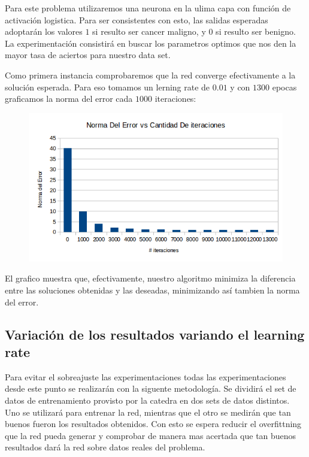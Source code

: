 Para este problema utilizaremos una neurona en la ulima capa con función de activación logistica. Para ser consistentes con esto, las salidas esperadas adoptarán los valores $1$ si resulto ser cancer maligno, y $0$ si resulto ser benigno. La experimentación consistirá en buscar los parametros optimos que nos den la mayor tasa de aciertos para nuestro data set.

Como primera instancia comprobaremos que la red converge efectivamente a la solución esperada. Para eso tomamos un lerning rate de $0.01$ y con $1300$ epocas graficamos la norma del error cada $1000$ iteraciones:

\begin{figure}[h!]
  \centering
    \includegraphics[scale=0.4]{ej1_convergencia/1.png}
\end{figure}

El grafico muestra que, efectivamente, nuestro algoritmo minimiza la diferencia entre las soluciones obtenidas y las deseadas, minimizando así tambien la norma del error.

\subsection{Variación de los resultados variando el learning rate} 

Para evitar el sobreajuste las experimentaciones todas las experimentaciones desde este punto se realizarán con la siguente metodología. Se dividirá el set de datos de entrenamiento provisto por la catedra en dos sets de datos distintos. Uno se utilizará para entrenar la red, mientras que el otro se medirán que tan buenos fueron los resultados obtenidos. Con esto se espera reducir el overfittning que la red pueda generar y comprobar de manera mas acertada que tan buenos resultados dará la red sobre datos reales del problema.

